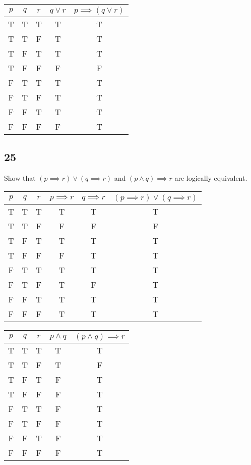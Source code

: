 \documentclass{article}
\begin{document}
\begin{tabular}{ | c | c | c | c | c | }
	$ p $ & $ q $ & $ r $ & $ q \lor r $ & $ p \implies ( q \lor r ) $ \\
	\hline
	T & T & T & T & T \\
	T & T & F & T & T \\
	T & F & T & T & T \\
	T & F & F & F & F \\
	F & T & T & T & T \\
	F & T & F & T & T \\
	F & F & T & T & T \\
	F & F & F & F & T \\
\end{tabular}

\subsection{25}

Show that $ ( p \implies r ) \lor ( q \implies r ) $ and $ ( p \land q ) \implies r $ are logically equivalent.

\begin{tabular}{ | c | c | c | c | c | c | }
	$ p $ & $ q $ & $ r $ & $ p \implies r $ & $ q \implies r $ & $ ( p \implies r ) \lor ( q \implies r ) $ \\
	\hline
	T & T & T & T & T & T \\
	T & T & F & F & F & F \\
	T & F & T & T & T & T \\
	T & F & F & F & T & T \\
	F & T & T & T & T & T \\
	F & T & F & T & F & T \\
	F & F & T & T & T & T \\
	F & F & F & T & T & T \\
\end{tabular}

\begin{tabular}{ | c | c | c | c | c | }
	$ p $ & $ q $ & $ r $ & $ p \land q $ & $ ( p \land q ) \implies r $ \\
	\hline
	T & T & T & T & T \\
	T & T & F & T & F \\
	T & F & T & F & T \\
	T & F & F & F & T \\
	F & T & T & F & T \\
	F & T & F & F & T \\
	F & F & T & F & T \\
	F & F & F & F & T \\
\end{tabular}
\end{document}
